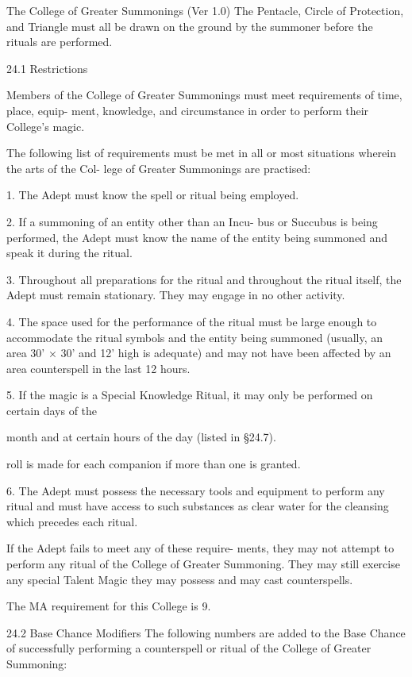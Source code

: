 \begin{Chapter}{The College of Greater Summonings (Ver 1.0)}
The  Pentacle,  Circle  of  Protection,  and  Triangle 
must all be drawn on the ground by the summoner 
before the rituals are performed. 

24.1 Restrictions 

Members of the College of Greater Summonings 
must  meet  requirements  of  time,  place,  equip-
ment,  knowledge,  and  circumstance  in  order  to 
perform their College’s magic. 

The  following  list  of  requirements  must be  met  in 
all  or  most  situations  wherein  the  arts  of  the  Col-
lege of Greater Summonings are practised: 

1.  The  Adept  must  know  the  spell  or  ritual  being 
employed. 

2. If a summoning of an entity other than an Incu-
bus  or  Succubus  is  being  performed,  the  Adept 
must know the name of the entity being summoned 
and speak it during the ritual. 

3.  Throughout  all  preparations  for  the  ritual  and 
throughout the ritual itself, the Adept must remain 
stationary. They may engage in no other activity. 

4. The space used for the performance of the ritual 
must  be  large  enough  to  accommodate  the  ritual 
symbols  and  the  entity  being  summoned  (usually, 
an  area  30’  ×  30’  and  12’  high  is  adequate)  and 
may not have been affected by an area counterspell 
in the last 12 hours. 

5.  If  the  magic  is  a  Special  Knowledge  Ritual,  it 
may  only  be  performed  on  certain  days  of  the 

month  and  at  certain  hours  of  the  day  (listed  in 
§24.7). 

roll is made for each companion if more than one is 
granted. 

6. The Adept must possess the necessary tools and 
equipment  to  perform  any  ritual  and  must  have 
access  to  such  substances  as  clear  water  for  the 
cleansing which precedes each ritual. 

If  the  Adept  fails  to  meet  any  of  these  require-
ments, they  may  not  attempt to  perform any  ritual 
of  the  College  of  Greater  Summoning.  They  may 
still  exercise  any  special  Talent  Magic  they  may 
possess and may cast counterspells. 

The MA requirement for this College is 9. 

24.2 Base Chance Modifiers 
The  following  numbers  are  added  to  the  Base 
Chance  of  successfully  performing  a  counterspell 
or ritual of the College of Greater Summoning: 


\end{Chapter}
